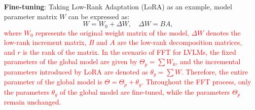 \documentclass[lettersize,journal]{IEEEtran}
\begin{document}
\textbf{Fine-tuning}:
Taking Low-Rank Adaptation (LoRA) \cite{lora} as an example, model parameter matrix $W$ can be expressed as:
\begin{equation}
    W = W_0 + \Delta W, \quad \Delta W = BA,
\end{equation}
\textcolor{red}{where $W_0$ represents the original weight matrix of the model, $\Delta W$ denotes the low-rank increment matrix, $B$ and $A$ are the low-rank decomposition matrices, and $r$ is the rank of the matrix. In the scenario of FFT for LVLMs, the fixed parameters of the global model are given by $\Theta_p = \sum {W_0}$, and the incremental parameters introduced by LoRA are denoted as $\theta_g = \sum {W}$. Therefore, the entire parameter of the global model is $\Theta = \Theta_p + \theta_g$. Throughout the FFT process, only the parameters $\theta_g$ of the global model are fine-tuned, while the parameters $\Theta_p$ remain unchanged.}
    
    
\end{document}
